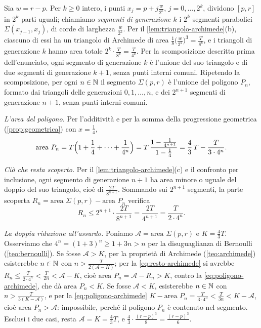 \begin{dimostrazione}
Sia $w=r-p$. Per $k\ge0$ intero, i punti $x_{j}=p+j\frac w{2^{k}}$,
$j=0,\dots,2^{k}$, dividono $[p,r]$ in $2^{k}$ parti uguali; chiamiamo \emph{segmenti di
generazione $k$} i $2^{k}$ segmenti parabolici $\Sigma(x_{j-1},x_{j})$, di corde di
larghezza $\frac w{2^{k}}$. Per il \cref{lem:triangolo-archimede}(b), ciascuno di essi
ha un triangolo di Archimede di area $\frac18\bigl(\frac w{2^{k}}\bigr)^{3}=\frac
T{8^{k}}$, e i triangoli di generazione $k$ hanno area totale
$2^{k}\cdot\frac T{8^{k}}=\frac T{4^{k}}$. Per la scomposizione descritta prima
dell'enunciato, ogni segmento di generazione $k$ è l'unione del suo triangolo e di due
segmenti di generazione $k+1$, senza punti interni comuni. Ripetendo la scomposizione,
per ogni $n\in\mathbb{N}$ il segmento $\Sigma(p,r)$ è l'unione del poligono $P_{n}$, formato dai
triangoli delle generazioni $0,1,\dots,n$, e dei $2^{n+1}$ segmenti di generazione
$n+1$, senza punti interni comuni.

\emph{L'area del poligono.} Per l'additività e per la somma della progressione
geometrica (\cref{prop:geometrica}) con $x=\frac14$,
\begin{equation}\label{eq:poligono-archimede}
  \text{area }P_{n}=T\Bigl(1+\frac14+\dots+\frac1{4^{n}}\Bigr)
  =T\,\frac{1-\frac1{4^{n+1}}}{1-\frac14}=\frac43\,T-\frac T{3\cdot4^{n}} .
\end{equation}

\emph{Ciò che resta scoperto.} Per il \cref{lem:triangolo-archimede}(c) e il confronto
per inclusione, ogni segmento di generazione $n+1$ ha area minore o uguale del doppio
del suo triangolo, cioè di $\frac{2T}{8^{n+1}}$. Sommando sui $2^{n+1}$ segmenti, la parte
scoperta $R_{n}=\text{area }\Sigma(p,r)-\text{area }P_{n}$ verifica
\begin{equation}\label{eq:resto-archimede}
  R_{n}\le2^{n+1}\cdot\frac{2T}{8^{n+1}}=\frac{2T}{4^{n+1}}=\frac T{2\cdot4^{n}} .
\end{equation}

\emph{La doppia riduzione all'assurdo.} Poniamo $\mathcal A=\text{area }\Sigma(p,r)$ e
$K=\frac43T$. Osserviamo che $4^{n}=(1+3)^{n}\ge1+3n>n$ per la disuguaglianza di
Bernoulli (\cref{teo:bernoulli}). Se fosse $\mathcal A>K$, per la proprietà di
Archimede (\cref{teo:archimede}) esisterebbe $n\in\mathbb{N}$ con $n>\frac T{2(\mathcal A-K)}$;
per la \eqref{eq:resto-archimede} si avrebbe $R_{n}\le\frac T{2\cdot4^{n}}<\frac T{2n}
<\mathcal A-K$, cioè $\text{area }P_{n}=\mathcal A-R_{n}>K$, contro la
\eqref{eq:poligono-archimede}, che dà $\text{area }P_{n}<K$. Se fosse $\mathcal A<K$,
esisterebbe $n\in\mathbb{N}$ con $n>\frac T{3(K-\mathcal A)}$, e per la
\eqref{eq:poligono-archimede} $K-\text{area }P_{n}=\frac T{3\cdot4^{n}}<\frac T{3n}<
K-\mathcal A$, cioè $\text{area }P_{n}>\mathcal A$: impossibile, perché il poligono $P_{n}$
è contenuto nel segmento. Esclusi i due casi, resta $\mathcal A=K=\frac43T$, e
$\frac43\cdot\frac{(r-p)^{3}}8=\frac{(r-p)^{3}}6$.
\end{dimostrazione}

